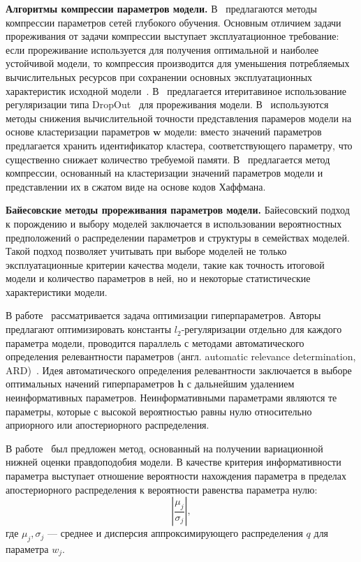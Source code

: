 \textbf{Алгоритмы компрессии параметров модели.}
В~\cite{weight_quantization, weight_quantization2,nvidia_prune} предлагаются методы компрессии параметров сетей глубокого обучения. Основным отличием задачи прореживания от задачи компрессии выступает эксплуатационное требование: если прореживание используется для получения оптимальной и наиболее устойчивой модели, то компрессия производится для уменьшения потребляемых вычислительных ресурсов при сохранении основных эксплуатационных характеристик исходной модели~\cite{weight_quantization2}.
В~\cite{nvidia_prune}
предлагается итеритавиное использование регуляризации типа DropOut~\cite{dropout} для прореживания модели. 
В~\cite{weight_quantization, weight_quantization2} используются методы снижения вычислительной точности представления парамеров модели на основе кластеризации параметров $\mathbf{w}$ модели: вместо значений параметров предлагается хранить идентификатор кластера, соответствующего параметру, что существенно снижает количество требуемой памяти.
В~\cite{weight_quantization2} предлагается метод компрессии, основанный на кластеризации значений параметров модели и представлении их в сжатом виде на основе кодов Хаффмана.

\textbf{Байесовские методы прореживания параметров модели. }
Байесовский подход к порождению и выбору моделей заключается в использовании вероятностных предположений о распределении параметров и структуры в семействах моделей. Такой подход позволяет учитывать при выборе моделей не только эксплуатационные критерии качества модели, такие как точность итоговой модели и количество параметров в ней, но и некоторые статистические характеристики модели. 

В работе~\cite{hyper} рассматривается задача оптимизации гиперпараметров.  Авторы предлагают оптимизировать константы $l_2$-регуляризации отдельно для каждого параметра модели, проводится параллель с методами автоматического определения релевантности параметров (англ. automatic relevance determination, ARD)~\cite{MacKay}. 
Идея автоматического определения релевантности заключается в выборе оптимальных начений гиперпараметров $\mathbf{h}$ с дальнейшим удалением неинформативных параметров. Неинформативными параметрами являются те параметры, которые с высокой вероятностью равны нулю относительно априорного или апостериорного распределения.

В работе~\cite{nips} был предложен метод, основанный на получении вариационной нижней оценки правдоподобия модели. В качестве критерия информативности параметра выступает отношение вероятности нахождения параметра в пределах апостериорного распределения к вероятности равенства параметра нулю:
\[
    \left|\frac{\mu_j}{\sigma_j}\right|,  
\]
где $\mu_j, \sigma_j$ --- среднее и дисперсия аппроксимирующего распределения $q$ для параметра $w_j$.

